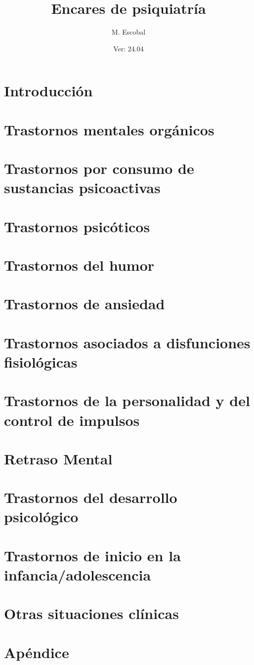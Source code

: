 \documentclass{scrbook}
\title{Encares de psiquiatría}
\author{M. Escobal}
\date{Ver: 24.04}
\begin{document}
\maketitle
\tableofcontents
\part{Introducción}

\part{Trastornos mentales orgánicos}
	

\part{Trastornos por consumo de sustancias psicoactivas}


\part{Trastornos psicóticos}




\part{Trastornos del humor}



\part{Trastornos de ansiedad}









\part{Trastornos asociados a disfunciones fisiológicas}


\part{Trastornos de la personalidad y del control de impulsos}



\part{Retraso Mental}

\part{Trastornos del desarrollo psicológico}

\part{Trastornos de inicio en la infancia/adolescencia}



\part{Otras situaciones clínicas}



\part{Apéndice}


\end{document}
